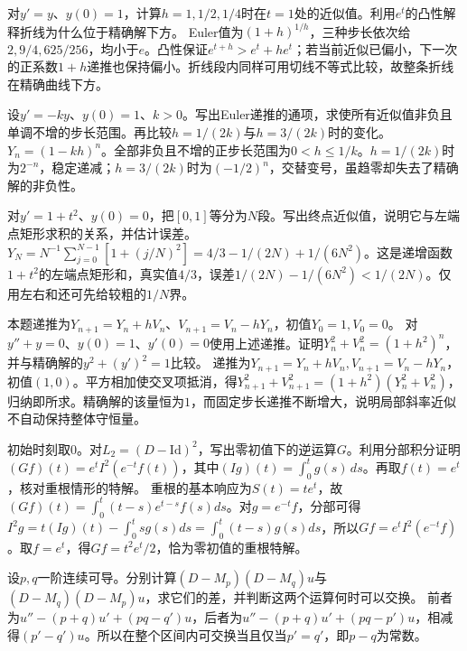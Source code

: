 对\(y'=y\)、\(y(0)=1\)，计算\(h=1,1/2,1/4\)时在\(t=1\)处的近似值。利用\(e^t\)的凸性解释折线为什么位于精确解下方。
\solutionanswer
Euler值为\((1+h)^{1/h}\)，三种步长依次给\(2,9/4,625/256\)，均小于\(e\)。凸性保证\(e^{t+h}>e^t+he^t\)；若当前近似已偏小，下一次的正系数\(1+h\)递推也保持偏小。折线段内同样可用切线不等式比较，故整条折线在精确曲线下方。


设\(y'=-ky\)、\(y(0)=1\)、\(k>0\)。写出Euler递推的通项，求使所有近似值非负且单调不增的步长范围。再比较\(h=1/(2k)\)与\(h=3/(2k)\)时的变化。
\solutionanswer
\(Y_n=(1-kh)^n\)。全部非负且不增的正步长范围为\(0<h\le1/k\)。\(h=1/(2k)\)时为\(2^{-n}\)，稳定递减；\(h=3/(2k)\)时为\((-1/2)^n\)，交替变号，虽趋零却失去了精确解的非负性。


对\(y'=1+t^2\)、\(y(0)=0\)，把\([0,1]\)等分为\(N\)段。写出终点近似值，说明它与左端点矩形求积的关系，并估计误差。
\solutionanswer
\(Y_N=N^{-1}\sum_{j=0}^{N-1}[1+(j/N)^2]=4/3-1/(2N)+1/(6N^2)\)。这是递增函数\(1+t^2\)的左端点矩形和，真实值\(4/3\)，误差\(1/(2N)-1/(6N^2)<1/(2N)\)。仅用左右和还可先给较粗的\(1/N\)界。


本题递推为\(Y_{n+1}=Y_n+hV_n\)、\(V_{n+1}=V_n-hY_n\)，初值\(Y_0=1,V_0=0\)。
对\(y''+y=0\)、\(y(0)=1\)、\(y'(0)=0\)使用上述递推。证明\(Y_n^2+V_n^2=(1+h^2)^n\)，并与精确解的\(y^2+(y')^2=1\)比较。
\solutionanswer
递推为\(Y_{n+1}=Y_n+hV_n,V_{n+1}=V_n-hY_n\)，初值\((1,0)\)。平方相加使交叉项抵消，得\(Y_{n+1}^2+V_{n+1}^2=(1+h^2)(Y_n^2+V_n^2)\)，归纳即所求。精确解的该量恒为\(1\)，而固定步长递推不断增大，说明局部斜率近似不自动保持整体守恒量。


初始时刻取\(0\)。对\(L_2=(D-\mathrm{Id})^2\)，写出零初值下的逆运算\(G\)。利用分部积分证明\((Gf)(t)=e^tI^2(e^{-t}f(t))\)，其中\((Ig)(t)=\int_0^t g(s)\,ds\)。再取\(f(t)=e^t\)，核对重根情形的特解。
\solutionanswer
重根的基本响应为\(S(t)=te^t\)，故\((Gf)(t)=\int_0^t(t-s)e^{t-s}f(s)ds\)。对\(g=e^{-t}f\)，分部可得\(I^2g=t(Ig)(t)-\int_0^tsg(s)ds=\int_0^t(t-s)g(s)ds\)，所以\(Gf=e^tI^2(e^{-t}f)\)。取\(f=e^t\)，得\(Gf=t^2e^t/2\)，恰为零初值的重根特解。


设\(p,q\)一阶连续可导。分别计算\((D-M_p)(D-M_q)u\)与\((D-M_q)(D-M_p)u\)，求它们的差，并判断这两个运算何时可以交换。
\solutionanswer
前者为\(u''-(p+q)u'+(pq-q')u\)，后者为\(u''-(p+q)u'+(pq-p')u\)，相减得\((p'-q')u\)。所以在整个区间内可交换当且仅当\(p'=q'\)，即\(p-q\)为常数。


